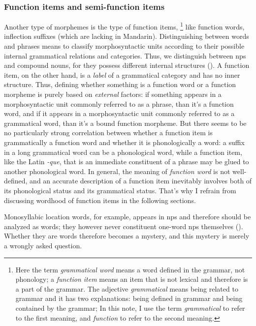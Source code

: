 \documentclass[UTF8, a4paper, oneside, scheme=plain]{ctexrep}
\newcommand*{\term}[1]{\emph{#1}}
\newcommand{\corpus}[1]{\emph{#1}}
\begin{document}
\subsubsection{Function items and semi-function items} 

Another type of morphemes is the type of function items,%
\footnote{
    Here the term \term{grammatical word} 
    means a word defined in the grammar, not phonology;
    a \term{function item} means an item that is not lexical
    and therefore is a part of the grammar. 
    The adjective \term{grammatical} means being related to grammar
    and it has two explanations:
    being defined in grammar and being contained by the grammar; 
    In this note, I use the term \term{grammatical} to refer to the first meaning, 
    and \term{function} to refer to the second meaning.
} 
like function words, inflection suffixes (which are lacking in Mandarin).
Distinguishing between words and phrases 
means to classify morphosyntactic units 
according to their possible internal
grammatical relations and categories.
Thus, we distinguish between \acs{np}s and compound nouns, 
for they possess different internal structures 
().
A function item, on the other hand, is a \emph{label} of a grammatical category
and has no inner structure.
Thus, defining whether something is a function word or a function morpheme
is purely based on \emph{external} factors:
if something appears in a morphosyntactic unit commonly referred to as a phrase, 
than it's a function word, 
and if it appears in a morphosyntactic unit commonly referred to as a grammatical word, 
than it's a bound function morpheme.
But there seems to be no particularly strong correlation 
between whether a function item is grammatically a function word
and whether it is phonologically a word: 
a suffix in a long grammatical word can be a phonological word, 
while a function item, like the Latin \corpus{-que}, that is an immediate constituent of a phrase 
may be glued to another phonological word. 
In general, the meaning of \term{function word} is not well-defined, 
and an accurate description of a function item 
inevitably involves both of its phonological status and its grammatical status.
That's why I refrain from discussing wordhood of function items in the following sections.

Monosyllabic location words, 
for example, appears in \acs{np}s 
and therefore should be analyzed as words;
they however never constituent one-word \acs{np}s themselves
().
Whether they are words therefore becomes a mystery,
and this mystery is merely a wrongly asked question.
\end{document}
